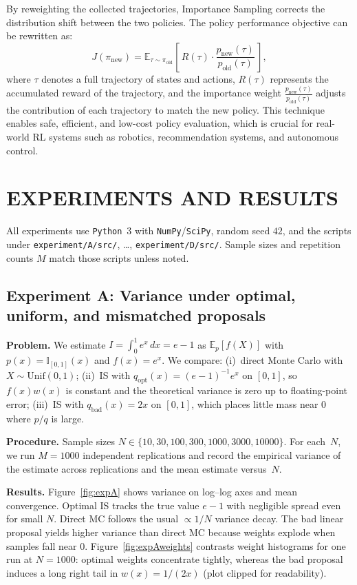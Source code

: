 \documentclass[conference,compsoc]{IEEEtran}
\begin{document}
By reweighting the collected trajectories, Importance Sampling corrects the distribution shift between the two policies. The policy performance objective can be rewritten as:
\[
J(\pi_{\text{new}}) = \mathbb{E}_{\tau\sim\pi_{\text{old}}}\!\left[\,R(\tau)\cdot \frac{p_{\text{new}}(\tau)}{p_{\text{old}}(\tau)}\,\right],
\]
where \(\tau\) denotes a full trajectory of states and actions, \(R(\tau)\) represents the accumulated reward of the trajectory, and the importance weight \(\frac{p_{\text{new}}(\tau)}{p_{\text{old}}(\tau)}\) adjusts the contribution of each trajectory to match the new policy. This technique enables safe, efficient, and low-cost policy evaluation, which is crucial for real-world RL systems such as robotics, recommendation systems, and autonomous control.


\section{EXPERIMENTS AND RESULTS}
All experiments use \texttt{Python}~3 with \texttt{NumPy}/\texttt{SciPy}, random seed \(42\), and the scripts under \texttt{experiment/A/src/}, \ldots, \texttt{experiment/D/src/}. Sample sizes and repetition counts \(M\) match those scripts unless noted.

\subsection{Experiment A: Variance under optimal, uniform, and mismatched proposals}
\textbf{Problem.} We estimate \(I=\int_0^1 e^x\,dx=e-1\) as \(\mathbb{E}_p[f(X)]\) with \(p(x)=\mathbb{I}_{[0,1]}(x)\) and \(f(x)=e^x\). We compare: (i)~direct Monte Carlo with \(X\sim\mathrm{Unif}(0,1)\); (ii)~IS with \(q_{\mathrm{opt}}(x)=(e-1)^{-1}e^x\) on \([0,1]\), so \(f(x)w(x)\) is constant and the theoretical variance is zero up to floating-point error; (iii)~IS with \(q_{\mathrm{bad}}(x)=2x\) on \([0,1]\), which places little mass near \(0\) where \(p/q\) is large.

\textbf{Procedure.} Sample sizes \(N\in\{10,30,100,300,1000,3000,10000\}\). For each~\(N\), we run \(M=1000\) independent replications and record the empirical variance of the estimate across replications and the mean estimate versus~\(N\).

\textbf{Results.} Figure~\ref{fig:expA} shows variance on log--log axes and mean convergence. Optimal IS tracks the true value \(e-1\) with negligible spread even for small \(N\). Direct MC follows the usual \(\propto 1/N\) variance decay. The bad linear proposal yields higher variance than direct MC because weights explode when samples fall near \(0\). Figure~\ref{fig:expAweights} contrasts weight histograms for one run at \(N{=}1000\): optimal weights concentrate tightly, whereas the bad proposal induces a long right tail in \(w(x)=1/(2x)\) (plot clipped for readability).
\end{document}
